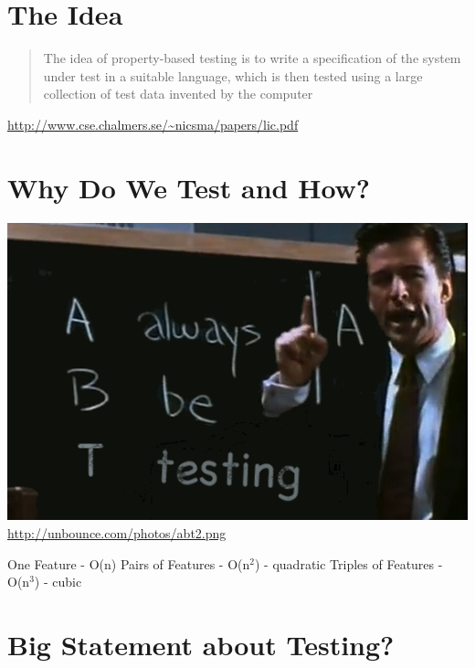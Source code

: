 \documentclass[11pt]{article}
\begin{document}
\section{The Idea}
\label{sec-12}
\begin{quote}
The idea of property-based testing is to write a specification
of the system under test in a suitable language, which is then
tested using a large collection of test data invented by the
computer
\end{quote}

\url{http://www.cse.chalmers.se/~nicsma/papers/lic.pdf}

\section{Why Do We Test and How?}
\label{sec-13}

\includegraphics[width=.9\linewidth]{../images/abt.png}
\url{http://unbounce.com/photos/abt2.png}

One Feature - O(n)
Pairs of Features - O(n\(^{\text{2}}\)) - quadratic
Triples of Features - O(n\(^{\text{3}}\)) - cubic
\section{Big Statement about Testing?}
\label{sec-14}
\end{document}
